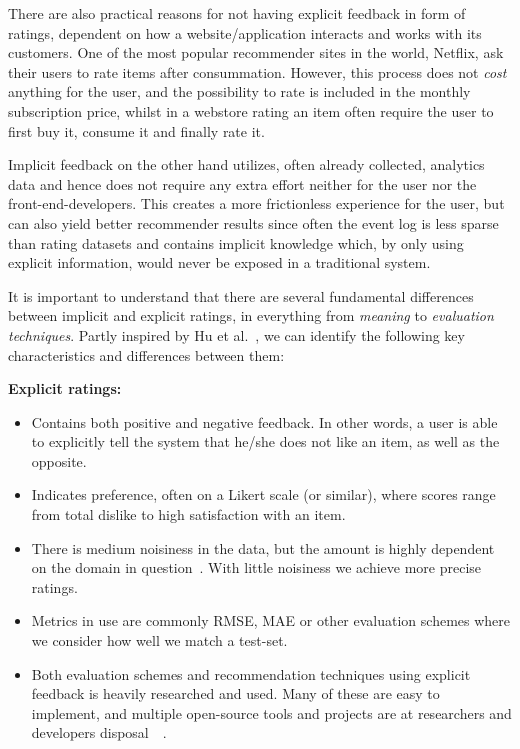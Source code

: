 There are also practical reasons for not having explicit feedback in form of
ratings, dependent on how a website/application interacts and works with its
customers. One of the most popular recommender sites in the world, Netflix, ask
their users to rate items after consummation. However, this process does not
\textit{cost} anything for the user, and the possibility to rate is included in
the monthly subscription price, whilst in a webstore rating an item often
require the user to first buy it, consume it and finally rate it.

Implicit feedback on the other hand utilizes, often already collected,
analytics data and hence does not require any extra effort neither for the user
nor the front-end-developers. This creates a more frictionless experience for
the user, but can also yield better recommender results since often the event
log is less sparse than rating datasets and contains implicit knowledge which,
by only using explicit information, would never be exposed in a traditional
system.

It is important to understand that there are several fundamental differences
between implicit and explicit ratings, in everything from \textit{meaning} to
\textit{evaluation techniques}. Partly inspired by Hu et al.~\cite{Hu2008}, we
can identify the following key characteristics and differences between them:

\vspace{3 mm}

\textbf{Explicit ratings:}
\begin{itemize}
\item Contains both positive and negative feedback. In other words, a user is
able to explicitly tell the system that he/she does not like an item, as well
as the opposite.
\item Indicates preference, often on a Likert scale (or similar), where scores
range from total dislike to high satisfaction with an item.
\item There is medium noisiness in the data, but the amount is highly dependent
on the domain in question~\cite{amatriain2009like}. With little noisiness we
achieve more precise ratings.
\item Metrics in use are commonly RMSE, MAE or other evaluation schemes where
we consider how well we match a test-set.
\item Both evaluation schemes and recommendation techniques using explicit
feedback is heavily researched and used. Many of these are easy to implement,
and multiple open-source tools and projects are at researchers and developers
disposal~\cite{mahout}~\cite{Gantner2011MyMediaLite}.
\end{itemize}

